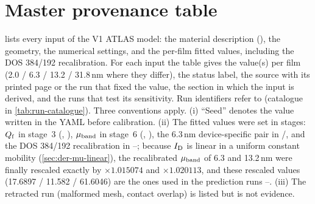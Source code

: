 
\section{Master provenance table}
\label{sec:lit-provenance}

 lists every input of the V1 ATLAS model: the material description
(), the geometry, the numerical settings, and the per-film
fitted values, including the DOS 384/192 recalibration. For each input the table gives the value(s)
per film (2.0 / 6.3 / 13.2 / 31.8\,nm where they differ), the status label, the source with its
printed page or the run that fixed the value, the section in which the input is derived, and the runs
that test its sensitivity. Run identifiers refer to  (catalogue in
\cref{tab:run-catalogue}). Three conventions apply. (i) ``Seed'' denotes the value written in the
YAML before calibration.
(ii) The fitted values were set in stages: $Q_{\mathrm{f}}$ in stage~3 (, ), $\mu_{\mathrm{band}}$ in
stage~6 (, ), the 6.3\,nm device-specific pair in /, and the
DOS 384/192 recalibration in --; because $I_{\mathrm{D}}$ is linear in a uniform constant
mobility (\cref{sec:der-mu-linear}), the recalibrated $\mu_{\mathrm{band}}$ of 6.3 and 13.2\,nm were finally
rescaled exactly by $\times1.015074$ and $\times1.020113$, and these rescaled values
(17.6897 / 11.582 / 61.6046) are the ones used in the prediction runs --.
(iii) The retracted run  (malformed mesh, contact overlap) is listed but is not evidence.

